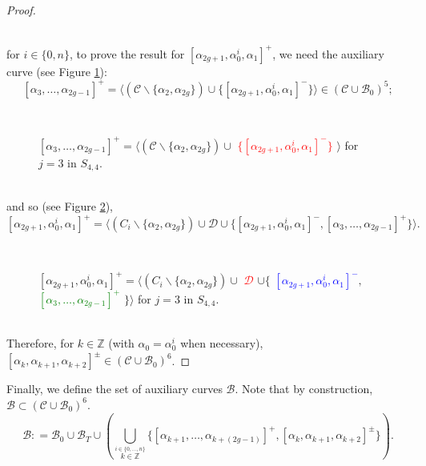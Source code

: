 \documentclass[twoside,11pt,a4paper]{article}
\newcommand*{\Cf}{\mathscr{C}}
\newcommand*{\Bf}{\mathscr{B}}
\newcommand*{\Df}{\mathscr{D}}
\newcommand*{\ColonEqq}{\mathrel{\mathop:}=}
\begin{document}
\begin{proof}
\begin{figure}[h]
\begin{center}
 \end{center}
\end{figure}\\
 for $i \in \{0,n\}$, to prove the result for $[\alpha_{2g+1},\alpha_{0}^{i},\alpha_{1}]^{+}$, we need the auxiliary curve (see Figure \ref{Translemaprop1fig11}): $$[\alpha_{3}, \ldots, \alpha_{2g-1}]^{+} = \langle (\Cf \backslash \{\alpha_{2}, \alpha_{2g}\}) \cup \{[\alpha_{2g+1}, \alpha_{0}^{i}, \alpha_{1}]^{-}\}\rangle \in (\Cf \cup \Bf_{0})^{5};$$
\begin{figure}[h]
 \begin{center}
  \resizebox{8cm}{!}{} \\[0.2cm]
  \resizebox{8cm}{!}{} \caption{$[\alpha_{3}, \ldots, \alpha_{2g-1}]^{+} = \langle (\Cf \backslash \{\alpha_{2}, \alpha_{2g}\}) \cup$ \textcolor{red}{$\{[\alpha_{2g+1}, \alpha_{0}^{i}, \alpha_{1}]^{-}\}$} $\rangle$ for $j = 3$ in $S_{4,4}$.}\label{Translemaprop1fig11}
 \end{center}
\end{figure}\\
 and so (see Figure \ref{Translemaprop1fig13}), $$[\alpha_{2g+1}, \alpha_{0}^{i}, \alpha_{1}]^{+} = \langle (C_{i} \backslash \{\alpha_{2},\alpha_{2g}\}) \cup \Df \cup \{[\alpha_{2g+1}, \alpha_{0}^{i}, \alpha_{1}]^{-}, [\alpha_{3}, \ldots, \alpha_{2g-1}]^{+}\}\rangle.$$
\begin{figure}[h]
 \begin{center}
  \resizebox{8cm}{!}{} \\[0.2cm]
  \resizebox{8cm}{!}{} \caption{$[\alpha_{2g+1}, \alpha_{0}^{i}, \alpha_{1}]^{+} = \langle (C_{i} \backslash \{\alpha_{2},\alpha_{2g}\}) \cup$ \textcolor{red}{$\Df$} $\cup \{$ \textcolor{blue}{$[\alpha_{2g+1}, \alpha_{0}^{i}, \alpha_{1}]^{-}$}$, $ \textcolor{green}{$[\alpha_{3}, \ldots, \alpha_{2g-1}]^{+}$} $\}\rangle$ for $j = 3$ in $S_{4,4}$.}\label{Translemaprop1fig13}
 \end{center}
\end{figure}\\
\indent Therefore, for $k \in \mathbb{Z}$ (with $\alpha_{0} = \alpha_{0}^{i}$ when necessary), $[\alpha_{k}, \alpha_{k+1}, \alpha_{k+2}]^{\pm} \in (\Cf \cup \Bf_{0})^{6}$.
\end{proof}
\indent Finally, we define the set of auxiliary curves $\Bf$. Note that by construction, $\Bf \subset (\Cf \cup \Bf_{0})^{6}$. $$\Bf \ColonEqq \Bf_{0} \cup \Bf_{T} \cup \left(\bigcup_{\stackrel{i \in \{0, \ldots, n\}}{\scriptscriptstyle k \in \mathbb{Z}}} \{[\alpha_{k+1}, \ldots, \alpha_{k+(2g-1)}]^{+}, [\alpha_{k},\alpha_{k+1},\alpha_{k+2}]^{\pm}\} \right).$$
\end{document}
